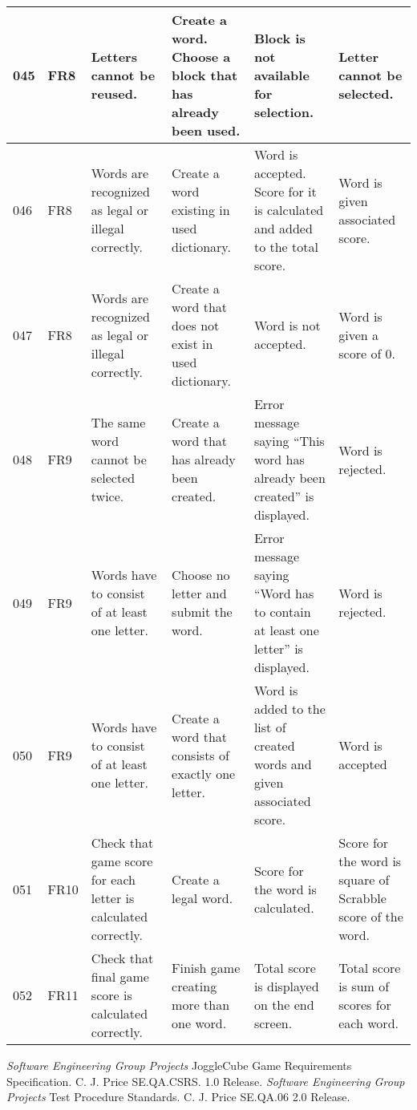 \documentclass{project}
\begin{document}
\begin{longtable}{|p{0.7cm}|p{1cm}|p{3.5cm}|p{3.2cm}|p{3.5cm}|p{3.5cm}|}
045 & FR8 & Letters cannot be reused. & Create a word. Choose a block that has already been used. 
& Block is not available for selection. & Letter cannot be selected. \\ \hline

046 & FR8 & Words are recognized as legal or illegal correctly. & Create a word existing in used dictionary. 
& Word is accepted. Score for it is calculated and added to the total score. & Word is given associated score. \\ \hline

047 & FR8 & Words are recognized as legal or illegal correctly. & Create a word that does not exist in used dictionary.
& Word is not accepted. & Word is given a score of 0. \\ \hline

048 & FR9 & The same word cannot be selected twice. & Create a word that has already been created. 
& Error message saying “This word has already been created” is displayed.  & Word is rejected. \\ \hline

049 & FR9 & Words have to consist of at least one letter. & Choose no letter and submit the word.
& Error message saying “Word has to contain at least one letter” is displayed. & Word is rejected. \\ \hline

050 & FR9 & Words have to consist of at least one letter. & Create a word that consists of exactly one letter.
& Word is added to the list of created words and given associated score. & Word is accepted \\ \hline

051 & FR10 & Check that game score for each letter is calculated correctly. & Create a legal word. 
& Score for the word is calculated. & Score for the word is square of Scrabble score of the word. \\ \hline

052 & FR11 & Check that final game score is calculated correctly. & Finish game creating more than one word.
& Total score is displayed on the end screen. & Total score is sum of scores for each word. \\ \hline

\end{longtable}

\clearpage
{}
\begin{thebibliography}{5}
 \emph{Software Engineering Group Projects}
JoggleCube Game Requirements Specification.
C. J. Price SE.QA.CSRS. 1.0 Release.
 \emph{Software Engineering Group Projects}
Test Procedure Standards.
C. J. Price SE.QA.06 2.0 Release.
\end{thebibliography}
\clearpage
{}
\end{document}
